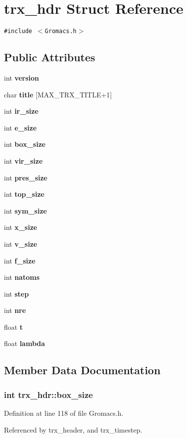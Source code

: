 \section{trx\_\-hdr  Struct Reference}
\label{structtrx__hdr}
{\tt \#include $<$Gromacs.h$>$}

\subsection*{Public Attributes}
\begin{CompactItemize}
\item 
int {\bf version}
\item 
char {\bf title} [MAX\_\-TRX\_\-TITLE+1]
\item 
int {\bf ir\_\-size}
\item 
int {\bf e\_\-size}
\item 
int {\bf box\_\-size}
\item 
int {\bf vir\_\-size}
\item 
int {\bf pres\_\-size}
\item 
int {\bf top\_\-size}
\item 
int {\bf sym\_\-size}
\item 
int {\bf x\_\-size}
\item 
int {\bf v\_\-size}
\item 
int {\bf f\_\-size}
\item 
int {\bf natoms}
\item 
int {\bf step}
\item 
int {\bf nre}
\item 
float {\bf t}
\item 
float {\bf lambda}
\end{CompactItemize}


\subsection{Member Data Documentation}
\subsubsection{\setlength{\rightskip}{0pt plus 5cm}int trx\_\-hdr::box\_\-size}\label{structtrx__hdr_m4}




Definition at line 118 of file Gromacs.h.

Referenced by trx\_\-header, and trx\_\-timestep.
